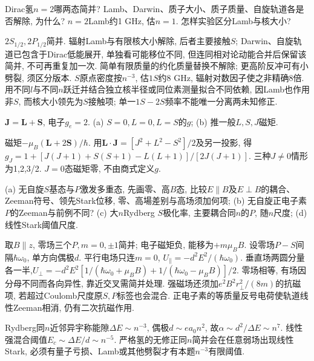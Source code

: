 \begin{exercise}Dirac氢$n=2$哪两态简并? Lamb、Darwin、质子大小、质子质量、自旋轨道各是否解除, 为什么? $n=2$Lamb约1 GHz, 估$n=1$. 怎样实验区分Lamb与核大小?\end{exercise}
\begin{solution}$2S_{1/2},2P_{1/2}$简并. 辐射Lamb与有限核大小解除, 后者主要接触$S$; Darwin、自旋轨道已包含于Dirac低能展开, 单独看可能移位不同, 但连同相对论动能合并后保留该简并, 不可再重复加一次. 简单有限质量的约化质量替换不解除; 更高阶反冲可有小劈裂, 须区分版本. $S$原点密度按$n^{-3}$, 估$1S$约8 GHz, 辐射对数因子使之非精确8倍. 用不同$l$与不同$n$跃迁并结合独立核半径或同位素测量拟合不同依赖, 因Lamb也作用非$S$, 而核大小领先为$S$接触项; 单一$1S-2S$频率不能唯一分离两未知修正.
\end{solution}
\begin{exercise}$\mathbf J=\mathbf L+\mathbf S$, 电子$g_e=2$. (a) $S=0,L=0,L=S$的$g$; (b) 推一般$L,S,J$磁矩.\end{exercise}
\begin{solution}磁矩$-\mu_B(\mathbf L+2\mathbf S)/\hbar$. 用$\mathbf L\cdot\mathbf J=[J^2+L^2-S^2]/2$及另一投影, 得$g_J=1+[J(J+1)+S(S+1)-L(L+1)]/[2J(J+1)]$. 三种$J\ne0$情形为1,2,3/2. $J=0$态磁矩零, 不由商式定义$g$.
\end{solution}
\begin{exercise}(a) 无自旋$S$基态与$P$激发多重态, 先画零、高$B$态, 比较$E\parallel B$及$E\perp B$的耦合、Zeeman符号、领先Stark位移, 零、高場差别与高场须加何项; (b) 无自旋正电子素$P$的Zeeman与前例不同? (c) 大$n$Rydberg $S$极化率, 主要耦合同$n$的$P$, 随$n$尺度; (d) 线性Stark阈值尺度.\end{exercise}
\begin{solution}取$B\parallel z$, 零场三个$P,m=0,\pm1$简并; 电子磁矩负, 能移为$+m\mu_BB$. 设零场$P-S$间隔$\hbar\omega_0$, 单方向偶极$d$. 平行电场只连$m=0$, $U_\parallel=-d^2E^2/(\hbar\omega_0)$. 垂直场两圆分量各一半,$U_\perp=-d^2E^2[1/(\hbar\omega_0+\mu_BB)+1/(\hbar\omega_0-\mu_BB)]/2$. 零场相等, 有场因分母不同而各向异性, 靠近交叉需简并处理. 强磁场还须加$e^2B^2r_\perp^2/(8m)$的抗磁项, 若超过Coulomb尺度原$S,P$标签也会混合. 正电子素的等质量反号电荷使轨道线性Zeeman相消, 仍有二次抗磁作用.

Rydberg同$n$近邻异宇称能隙$\Delta E\sim n^{-3}$, 偶极$d\sim ea_0n^2$, 故$\alpha\sim d^2/\Delta E\sim n^7$. 线性强混合阈值$E_c\sim\Delta E/d\sim n^{-5}$. 严格氢的无修正同$n$简并会在任意弱场出现线性Stark, 必须有量子亏损、Lamb或其他劈裂才有本题$n^{-3}$有限阈值.
\end{solution}

